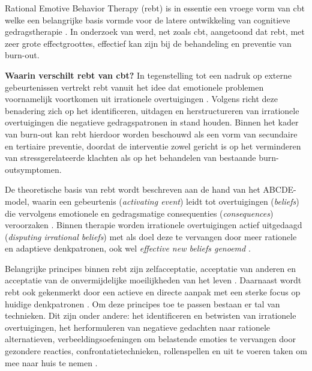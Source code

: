 \vspace{1em}

Rational Emotive Behavior Therapy (\acrshort{rebt}) is in essentie een vroege vorm van \acrshort{cbt} welke een belangrijke basis vormde voor de latere ontwikkeling van cognitieve gedragstherapie \autocite{reynolds-2025}. In onderzoek van \textcite{Madigan2023} werd, net zoals \acrshort{cbt}, aangetoond dat \acrshort{rebt}, met zeer grote effectgroottes, effectief kan zijn bij de behandeling en preventie van burn-out.

\vspace{1em}

\textbf{Waarin verschilt \acrshort{rebt} van \acrshort{cbt}?} In tegenstelling tot een nadruk op externe gebeurtenissen vertrekt \acrshort{rebt} vanuit het idee dat emotionele problemen voornamelijk voortkomen uit irrationele overtuigingen \autocite{reynolds-2025}. Volgens \textcite{Madigan2023} richt deze benadering zich op het identificeren, uitdagen en herstructureren van irrationele overtuigingen die negatieve gedragspatronen in stand houden. Binnen het kader van burn-out kan \acrshort{rebt} hierdoor worden beschouwd als een vorm van secundaire en tertiaire preventie, doordat de interventie zowel gericht is op het verminderen van stressgerelateerde klachten als op het behandelen van bestaande burn-outsymptomen.

\vspace{1em}

De theoretische basis van \acrshort{rebt} wordt beschreven aan de hand van het ABCDE-model, waarin een gebeurtenis (\textit{activating event}) leidt tot overtuigingen (\textit{beliefs}) die vervolgens emotionele en gedragsmatige consequenties (\textit{consequences}) veroorzaken \autocite{reynolds-2025}. Binnen therapie worden irrationele overtuigingen actief uitgedaagd (\textit{disputing irrational beliefs}) met als doel deze te vervangen door meer rationele en adaptieve denkpatronen, ook wel \textit{effective new beliefs genoemd} \autocite{reynolds-2025}.

\vspace{1em}

Belangrijke principes binnen \acrshort{rebt} zijn zelfacceptatie, acceptatie van anderen en acceptatie van de onvermijdelijke moeilijkheden van het leven \autocite{reynolds-2025}. Daarnaast wordt \acrshort{rebt} ook gekenmerkt door een actieve en directe aanpak met een sterke focus op huidige denkpatronen \autocite{reynolds-2025}. Om deze principes toe te passen bestaan er tal van technieken. Dit zijn onder andere: het identificeren en betwisten van irrationele overtuigingen, het herformuleren van negatieve gedachten naar rationele alternatieven, verbeeldingsoefeningen om belastende emoties te vervangen door gezondere reacties, confrontatietechnieken, rollenspellen en uit te voeren taken om mee naar huis te nemen \autocite{reynolds-2025}.

